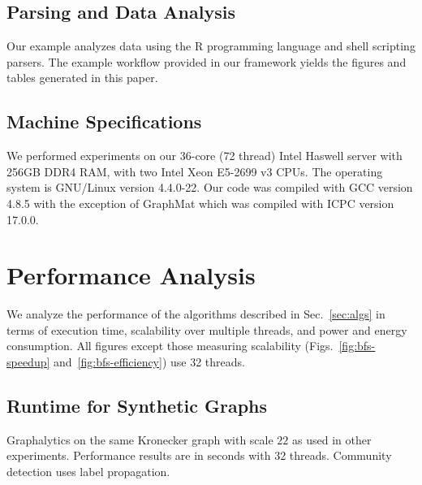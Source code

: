 \documentclass[conference]{IEEEtran}
\begin{document}
\subsection{Parsing and Data Analysis}
Our example analyzes data using the R programming language and shell scripting parsers. The example workflow provided in our framework yields the figures and tables generated in this paper.

\subsection{Machine Specifications}
We performed experiments on our 36-core (72 thread) Intel Haswell server with 256GB DDR4 RAM, with two Intel Xeon E5-2699 v3 CPUs. The operating system is GNU/Linux version 4.4.0-22. Our code was compiled with GCC version 4.8.5 with the exception of GraphMat which was compiled with ICPC version 17.0.0.

\section{Performance Analysis}\label{sec:perf}

We analyze the performance of the algorithms described in Sec.~\ref{sec:algs} in terms of execution time, scalability over multiple threads, and power and energy consumption. All figures except those measuring scalability (Figs.~\ref{fig:bfs-speedup} and~\ref{fig:bfs-efficiency}) use 32 threads.

\subsection{Runtime for Synthetic Graphs}

\begin{table}
	\caption{Graphalytics on the same Kronecker graph with scale $22$ as used in other experiments. Performance results are in seconds with 32 threads. Community detection uses label propagation.}
	\centering
	\label{tab:graphalytics}
\end{table}
\end{document}

